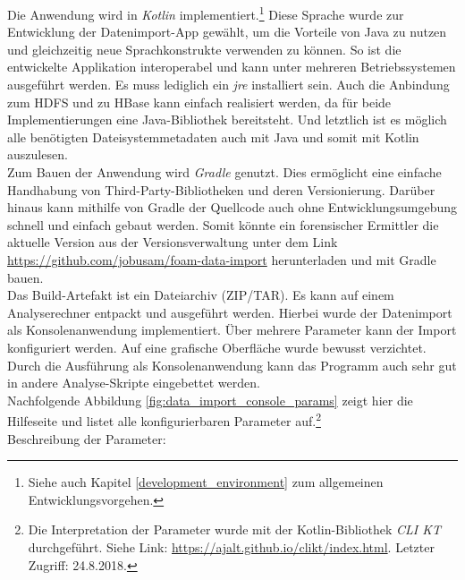 \noindent
Die Anwendung wird in \textit{Kotlin} implementiert.\footnote{Siehe auch Kapitel \ref{development_environment} zum allgemeinen Entwicklungsvorgehen.} Diese Sprache wurde zur Entwicklung der Datenimport-App gewählt, um die Vorteile von Java zu nutzen und gleichzeitig neue Sprachkonstrukte verwenden zu können. So ist die entwickelte Applikation interoperabel und kann unter mehreren Betriebssystemen ausgeführt werden. Es muss lediglich ein \textit{\gls{jre}}  installiert sein. Auch die Anbindung zum HDFS und zu HBase kann einfach realisiert werden, da für beide Implementierungen eine Java-Bibliothek bereitsteht. Und letztlich ist es möglich alle benötigten Dateisystemmetadaten auch mit Java und somit mit Kotlin auszulesen. \\
Zum Bauen der Anwendung wird \textit{Gradle} genutzt. Dies ermöglicht eine einfache Handhabung von Third-Party-Bibliotheken und deren Versionierung. Darüber hinaus kann mithilfe von Gradle der Quellcode auch ohne Entwicklungsumgebung schnell und einfach gebaut werden. Somit könnte ein forensischer Ermittler die aktuelle Version aus der Versionsverwaltung unter dem Link \url{https://github.com/jobusam/foam-data-import} herunterladen und mit Gradle bauen.\\
Das Build-Artefakt ist ein Dateiarchiv (ZIP/TAR). Es kann auf einem Analyserechner entpackt und ausgeführt werden. Hierbei wurde der Datenimport als Konsolenanwendung implementiert. Über mehrere Parameter kann der Import konfiguriert werden. Auf eine grafische Oberfläche wurde bewusst verzichtet. Durch die Ausführung als Konsolenanwendung kann das Programm auch sehr gut in andere Analyse-Skripte eingebettet werden.\\

\noindent
Nachfolgende Abbildung \ref{fig:data_import_console_params}  zeigt hier die Hilfeseite und listet alle konfigurierbaren Parameter auf.\footnote{Die Interpretation der Parameter wurde mit der Kotlin-Bibliothek \textit{CLI KT} durchgeführt. Siehe Link: \url{https://ajalt.github.io/clikt/index.html}. Letzter Zugriff: 24.8.2018.}\\
Beschreibung der Parameter:

